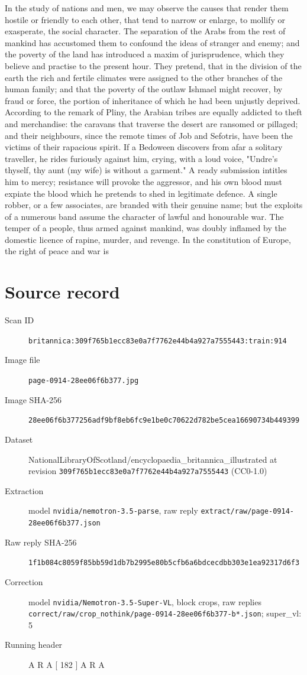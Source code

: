 \documentclass{article}
\begin{document}
In the study of nations and men, we may observe the causes that render them hostile or friendly to each other, that tend to narrow or enlarge, to mollify or exasperate, the social character. The separation of the Arabs from the rest of mankind has accustomed them to confound the ideas of stranger and enemy; and the poverty of the land has introduced a maxim of jurisprudence, which they believe and practise to the present hour. They pretend, that in the division of the earth the rich and fertile climates were assigned to the other branches of the human family; and that the poverty of the outlaw Ishmael might recover, by fraud or force, the portion of inheritance of which he had been unjustly deprived. According to the remark of Pliny, the Arabian tribes are equally addicted to theft and merchandise: the caravans that traverse the desert are ransomed or pillaged; and their neighbours, since the remote times of Job and Sefotris, have been the victims of their rapacious spirit. If a Bedoween discovers from afar a solitary traveller, he rides furiously against him, crying, with a loud voice, "Undre's thyself, thy aunt (my wife) is without a garment." A ready submission intitles him to mercy; resistance will provoke the aggressor, and his own blood must expiate the blood which he pretends to shed in legitimate defence. A single robber, or a few associates, are branded with their genuine name; but the exploits of a numerous band assume the character of lawful and honourable war. The temper of a people, thus armed against mankind, was doubly inflamed by the domestic licence of rapine, murder, and revenge. In the constitution of Europe, the right of peace and war is


\section*{Source record}
\begin{description}
\item[Scan ID] \texttt{britannica:309f765b1ecc83e0a7f7762e44b4a927a7555443:train:914}
\item[Image file] \texttt{page-0914-28ee06f6b377.jpg}
\item[Image SHA-256] \texttt{28ee06f6b377256adf9bf8eb6fc9e1be0c70622d782be5cea16690734b449399}
\item[Dataset] NationalLibraryOfScotland/encyclopaedia\_britannica\_illustrated at revision \texttt{309f765b1ecc83e0a7f7762e44b4a927a7555443} (CC0-1.0)
\item[Extraction] model \texttt{nvidia/nemotron-3.5-parse}, raw reply \texttt{extract/raw/page-0914-28ee06f6b377.json}
\item[Raw reply SHA-256] \texttt{1f1b084c8059f85bb59d1db7b2995e80b5cfb6a6bdcecdbb303e1ea92317d6f3}
\item[Correction] model \texttt{nvidia/Nemotron-3.5-Super-VL}, block crops, raw replies \texttt{correct/raw/crop\_nothink/page-0914-28ee06f6b377-b*.json}; super\_vl: 5
\item[Running header] A R A  [ 182 ] A R A
\end{description}
\end{document}
